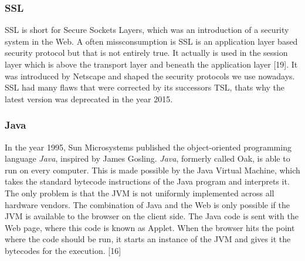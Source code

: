 \documentclass[runningheads]{llncs}
\begin{document}
			\subsubsection{SSL}
			\leavevmode\newline
			SSL is short for Secure Sockets Layers, which was an introduction of a security system in the Web. A often missconsumption is SSL is an application layer based security protocol but that is not entirely true. It actually is used in the session layer which is above the transport layer and beneath the application layer [19]. It was introduced by Netscape and shaped the security protocols we use nowadays. SSL had many flaws that were corrected by its successors TSL, thats why the latest version was deprecated in the year 2015.
			\subsubsection{Java}
			\leavevmode\newline
			In the year 1995, Sun Microsystems published the object-oriented programming language \textit{Java}, inspired by James Gosling. \textit{Java}, formerly called Oak, is able to run on every computer. This is made possible by the Java Virtual Machine, which takes the standard bytecode instructions of the Java program and interprets it. The only problem is that the JVM is not uniformly implemented across all hardware vendors. The combination of Java and the Web is only possible if the JVM is available to the browser on the client side. The Java code is sent with the Web page, where this code is known as Applet. When the browser hits the point where the code should be run, it starts an instance of the JVM and gives it the bytecodes for the execution. [16]
\end{document}
